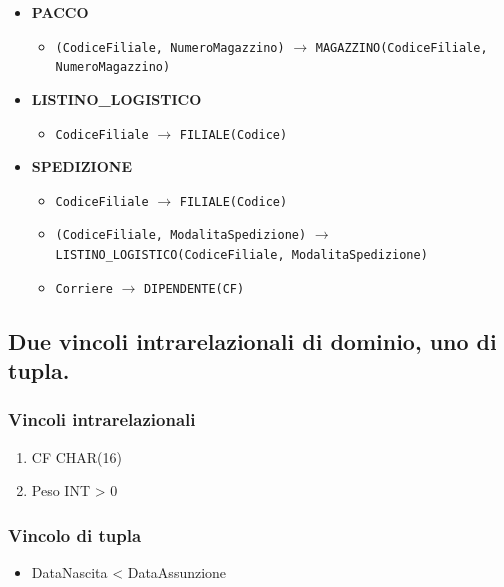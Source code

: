 \begin{itemize}
\begin{itemize}
            \item \textbf{PACCO}
            \begin{itemize}
                \item \texttt{(CodiceFiliale, NumeroMagazzino)} $\to$ \texttt{MAGAZZINO(CodiceFiliale, NumeroMagazzino)}
            \end{itemize}

            \item \textbf{LISTINO\_LOGISTICO}
            \begin{itemize}
                \item \texttt{CodiceFiliale} $\to$ \texttt{FILIALE(Codice)}
            \end{itemize}

            \item \textbf{SPEDIZIONE}
            \begin{itemize}
                \item \texttt{CodiceFiliale} $\to$ \texttt{FILIALE(Codice)}
                \item \texttt{(CodiceFiliale, ModalitaSpedizione)} $\to$ \texttt{LISTINO\_LOGISTICO(CodiceFiliale, ModalitaSpedizione)}
                \item \texttt{Corriere} $\to$ \texttt{DIPENDENTE(CF)}
            \end{itemize}
    \end{itemize}
    \end{itemize}

\subsection{Due vincoli intrarelazionali di dominio, uno di tupla.}
\subsubsection{Vincoli intrarelazionali}
\begin{enumerate}
    \item CF CHAR(16)
    \item Peso INT > 0
\end{enumerate}
\subsubsection{Vincolo di tupla}
\begin{itemize}
    \item DataNascita < DataAssunzione
\end{itemize}

